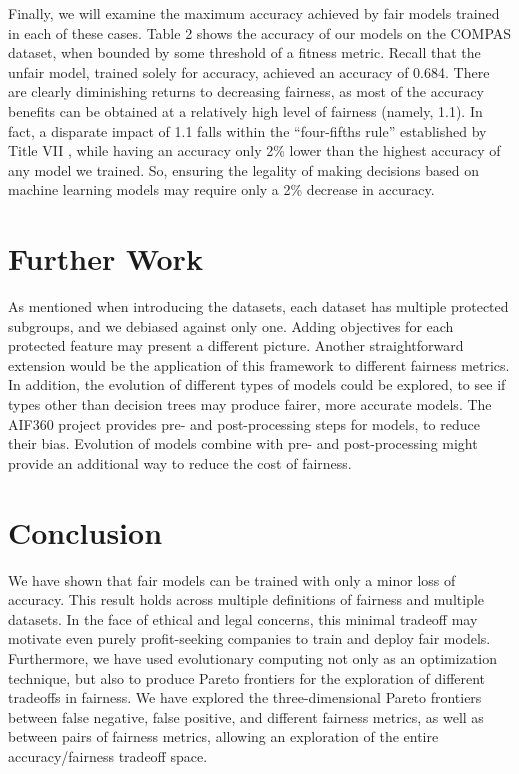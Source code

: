 \documentclass{elsarticle}
\begin{document}
Finally, we will examine the maximum accuracy achieved by fair models trained in each of these cases. Table 2 shows the accuracy of our models on the COMPAS dataset, when bounded by some threshold of a fitness metric. Recall that the unfair model, trained solely for accuracy, achieved an accuracy of 0.684. There are clearly diminishing returns to decreasing fairness, as most of the accuracy benefits can be obtained at a relatively high level of fairness (namely, 1.1). In fact, a disparate impact of 1.1 falls within the “four-fifths rule” established by Title VII \citep{Barocas:2016}, while having an accuracy only 2\% lower than the highest accuracy of any model we trained. So, ensuring the legality of making decisions based on machine learning models may require only a 2\% decrease in accuracy.

\section{Further Work}
As mentioned when introducing the datasets, each dataset has multiple protected subgroups, and we debiased against only one. Adding objectives for each protected feature may present a different picture. Another straightforward extension would be the application of this framework to different fairness metrics. In addition, the evolution of different types of models could be explored, to see if types other than decision trees may produce fairer, more accurate models. The AIF360 project provides pre- and post-processing steps for models, to reduce their bias. Evolution of models combine with pre- and post-processing might provide an additional way to reduce the cost of fairness.

\section{Conclusion}
We have shown that fair models can be trained with only a minor loss of accuracy. This result holds across multiple definitions of fairness and multiple datasets. In the face of ethical and legal concerns, this minimal tradeoff may motivate even purely profit-seeking companies to train and deploy fair models. Furthermore, we have used evolutionary computing not only as an optimization technique, but also to produce Pareto frontiers for the exploration of different tradeoffs in fairness. We have explored the three-dimensional Pareto frontiers between false negative, false positive, and different fairness metrics, as well as between pairs of fairness metrics, allowing an exploration of the entire accuracy/fairness tradeoff space.
 
\end{document}
